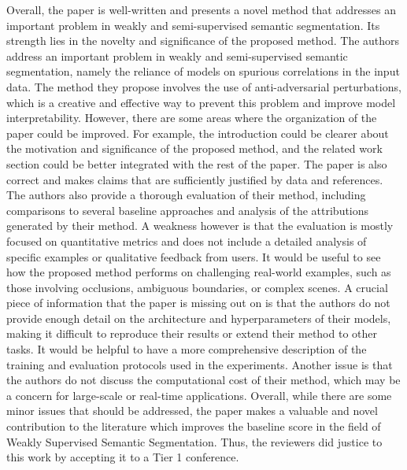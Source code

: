 \documentclass[11pt]{article}
\begin{document}
Overall, the paper is well-written and presents a novel method that addresses an important problem in weakly and semi-supervised semantic segmentation. Its strength lies in the novelty and significance of the proposed method. The authors address an important problem in weakly and semi-supervised semantic segmentation, namely the reliance of models on spurious correlations in the input data. The method they propose involves the use of anti-adversarial perturbations, which is a creative and effective way to prevent this problem and improve model interpretability. However, there are some areas where the organization of the paper could be improved. For example, the introduction could be clearer about the motivation and significance of the proposed method, and the related work section could be better integrated with the rest of the paper.  The paper is also correct and makes claims that are sufficiently justified by data and references. The authors also provide a thorough evaluation of their method, including comparisons to several baseline approaches and analysis of the attributions generated by their method. A weakness however is that the evaluation is mostly focused on quantitative metrics and does not include a detailed analysis of specific examples or qualitative feedback from users. It would be useful to see how the proposed method performs on challenging real-world examples, such as those involving occlusions, ambiguous boundaries, or complex scenes. A crucial piece of information that the paper is missing out on is that the authors do not provide enough detail on the architecture and hyperparameters of their models, making it difficult to reproduce their results or extend their method to other tasks. It would be helpful to have a more comprehensive description of the training and evaluation protocols used in the experiments. Another issue is that the authors do not discuss the computational cost of their method, which may be a concern for large-scale or real-time applications. Overall,  while there are some minor issues that should be addressed, the paper makes a valuable and novel contribution to the literature which improves the baseline score in the field of Weakly Supervised Semantic Segmentation. Thus, the reviewers did justice to this work by accepting it to a Tier 1 conference. \newline

\printbibliography
\end{document}
